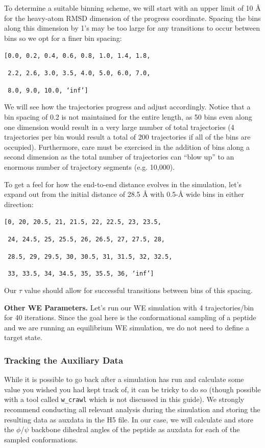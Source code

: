 \documentclass[9pt,tutorial]{livecoms}
\begin{document}
To determine a suitable binning scheme, we will start with an upper limit of 10 \AA{} for the heavy-atom RMSD dimension of the progress coordinate. 
Spacing the bins along this dimension by 1’s may be too large for any transitions to occur between bins so we opt for a finer bin spacing:

\verb|[0.0, 0.2, 0.4, 0.6, 0.8, 1.0, 1.4, 1.8,|

\verb| 2.2, 2.6, 3.0, 3.5, 4.0, 5.0, 6.0, 7.0,|

\verb| 8.0, 9.0, 10.0, ‘inf’]|

We will see how the trajectories progress and adjust accordingly. 
Notice that a bin spacing of 0.2 is not maintained for the entire length, as 50 bins even along one dimension would result in a very large number of total trajectories (4 trajectories per bin would result a total of 200 trajectories if all of the bins are occupied). 
Furthermore, care must be exercised in the addition of bins along a second dimension as the total number of trajectories can “blow up” to an enormous number of trajectory segments (e.g. 10,000).

To get a feel for how the end-to-end distance evolves in the simulation, let’s expand out from the initial distance of 28.5 \AA{} with 0.5-\AA{} wide bins in either direction:

\verb|[0, 20, 20.5, 21, 21.5, 22, 22.5, 23, 23.5,|

\verb| 24, 24.5, 25, 25.5, 26, 26.5, 27, 27.5, 28,|

\verb| 28.5, 29, 29.5, 30, 30.5, 31, 31.5, 32, 32.5,|

\verb| 33, 33.5, 34, 34.5, 35, 35.5, 36, ‘inf’]|

Our $\tau$ value should allow for successful transitions between bins of this spacing.

\textbf{Other WE Parameters.} Let’s run our WE simulation with 4 trajectories/bin for 40 iterations. 
Since the goal here is the conformational sampling of a peptide and we are running an equilibrium WE simulation, we do not need to define a target state.

\subsubsection{Tracking the Auxiliary Data}

While it is possible to go back after a simulation has run and calculate some value you wished you had kept track of, it can be tricky to do so (though possible with a tool called \verb|w_crawl| which is not discussed in this guide). 
We strongly recommend conducting all relevant analysis during the simulation and storing the resulting data as auxdata in the H5 file. 
In our case, we will  calculate and store the $\phi$/$\psi$ backbone dihedral angles of the peptide as auxdata for each of the sampled conformations.  
\end{document}
